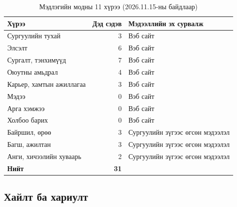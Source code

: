 \begin{table}[H]
\centering
\caption{Мэдлэгийн модны 11 хүрээ (2026.11.15-ны байдлаар)}
\label{tab:tree}
\begin{tabular}{|p{5.6cm}|r|p{5.6cm}|}
\hline
\textbf{Хүрээ} & \textbf{Дэд сэдэв} & \textbf{Мэдээллийн эх сурвалж} \\
\hline
Сургуулийн тухай & 3 & Вэб сайт \\
\hline
Элсэлт & 6 & Вэб сайт \\
\hline
Сургалт, тэнхимүүд & 7 & Вэб сайт \\
\hline
Оюутны амьдрал & 4 & Вэб сайт \\
\hline
Карьер, хамтын ажиллагаа & 3 & Вэб сайт \\
\hline
Мэдээ & 0 & Вэб сайт \\
\hline
Арга хэмжээ & 0 & Вэб сайт \\
\hline
Холбоо барих & 0 & Вэб сайт \\
\hline
Байршил, өрөө & 3 & Сургуулийн зүгээс өгсөн мэдээлэл \\
\hline
Багш, ажилтан & 3 & Сургуулийн зүгээс өгсөн мэдээлэл \\
\hline
Анги, хичээлийн хуваарь & 2 & Сургуулийн зүгээс өгсөн мэдээлэл \\
\hline
\textbf{Нийт} & \textbf{31} & \\
\hline
\end{tabular}
\end{table}

\subsection{Хайлт ба хариулт}

